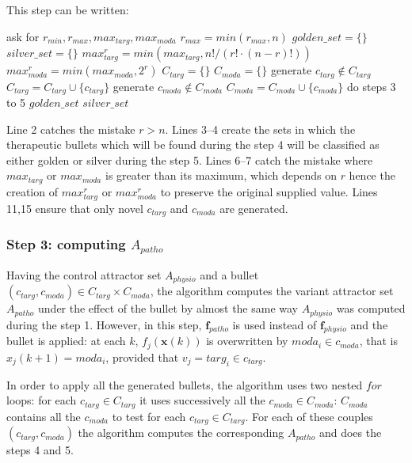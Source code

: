 \documentclass[oneside,a4paper,onecolumn,notitlepage]{article}
\begin{document}
This step can be written:
\begin{algorithmic}[1]
\STATE ask for $r_{min},r_{max},max_{targ},max_{moda}$
\STATE $r_{max}=min(r_{max},n)$
\STATE $golden\_set=\lbrace \rbrace$
\STATE $silver\_set=\lbrace \rbrace$
    \STATE $max_{targ}^{r}=min(max_{targ},n!/(r!\cdot (n-r)!))$
    \STATE $max_{moda}^{r}=min(max_{moda},2^{r})$
    \STATE $C_{targ}=\lbrace \rbrace$
    \STATE $C_{moda}=\lbrace \rbrace$
        \STATE generate $c_{targ}\notin C_{targ}$
        \STATE $C_{targ}=C_{targ}\cup \lbrace c_{targ}\rbrace$
    \ENDWHILE
        \STATE generate $c_{moda}\notin C_{moda}$
        \STATE $C_{moda}=C_{moda}\cup \lbrace c_{moda}\rbrace$
    \ENDWHILE
    \STATE do steps 3 to 5
\ENDFOR
\RETURN $golden\_set$
\RETURN $silver\_set$
\end{algorithmic}
Line 2 catches the mistake $r>n$. Lines 3--4 create the sets in which the therapeutic bullets which will be found during the step 4 will be classified as either golden or silver during the step 5. Lines 6--7 catch the mistake where $max_{targ}$ or $max_{moda}$ is greater than its maximum, which depends on $r$ hence the creation of $max_{targ}^{r}$ or $max_{moda}^{r}$ to preserve the original supplied value. Lines 11,15 ensure that only novel $c_{targ}$ and $c_{moda}$ are generated.

\subsubsection*{Step 3: computing $A_{patho}$}
Having the control attractor set $A_{physio}$ and a bullet $(c_{targ},c_{moda})\in C_{targ}\times C_{moda}$, the algorithm computes the variant attractor set $A_{patho}$ under the effect of the bullet by almost the same way $A_{physio}$ was computed during the step 1. However, in this step, $\boldsymbol{f}_{patho}$ is used instead of $\boldsymbol{f}_{physio}$ and the bullet is applied: at each $k$, $f_j(\boldsymbol{x}(k))$ is overwritten by $moda_i\in c_{moda}$, that is $x_j(k+1)=moda_i$, provided that $v_j=targ_i\in c_{targ}$.

In order to apply all the generated bullets, the algorithm uses two nested $for$ loops: for each $c_{targ}\in C_{targ}$ it uses successively all the $c_{moda}\in C_{moda}$: $C_{moda}$ contains all the $c_{moda}$ to test for each $c_{targ}\in C_{targ}$. For each of these couples $(c_{targ},c_{moda})$ the algorithm computes the corresponding $A_{patho}$ and does the steps 4 and 5.
\end{document}
